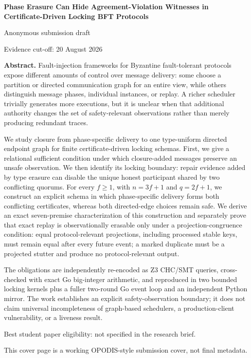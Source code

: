\documentclass[10pt,a4paper]{article}
\begin{document}
\begin{titlepage}
\centering
\vspace*{22mm}
{\LARGE\bfseries Phase Erasure Can Hide Agreement-Violation Witnesses in
Certificate-Driven Locking BFT Protocols\par}
\vspace{14mm}
{\large Anonymous submission draft\par}
\vspace{8mm}
{\small Evidence cut-off: 20 August 2026\par}
\vfill
\begin{minipage}{0.88\textwidth}
\textbf{Abstract.}
Fault-injection frameworks for Byzantine fault-tolerant protocols expose
different amounts of control over message delivery: some choose a
partition or directed communication graph for an entire view, while
others distinguish message phases, individual instances, or replay. A
richer scheduler trivially generates more executions, but it is unclear
when that additional authority changes the set of safety-relevant
observations rather than merely producing redundant traces.

We study closure from phase-specific delivery to one type-uniform
directed endpoint graph for finite certificate-driven locking schemas.
First, we give a relational sufficient condition under which
closure-added messages preserve an unsafe observation. We then identify
its locking boundary: repair evidence added by type erasure can disable
the unique honest participant shared by two conflicting quorums. For
every \(f\geq1\), with \(n=3f+1\) and \(q=2f+1\), we construct an
explicit schema in which phase-specific delivery forms both conflicting
certificates, whereas both directed-edge choices remain safe. We derive
an exact seven-premise characterization of this construction and
separately prove that exact replay is observationally erasable only
under a projection-congruence condition: equal protocol-relevant
projections, including processed stable keys, must remain equal after
every future event; a marked duplicate must be a projected stutter and
produce no protocol-relevant output.

The obligations are independently re-encoded as Z3 CHC/SMT queries,
cross-checked with exact Go big-integer arithmetic, and reproduced in
two bounded locking kernels plus a fuller two-round Go event loop and an
independent Python mirror. The work establishes an explicit
safety-observation boundary; it does not claim universal incompleteness
of graph-based schedulers, a production-client vulnerability, or a
liveness result.
\end{minipage}
\vfill
{\small Best student paper eligibility: not specified in the research brief.\par}
{\small This cover page is a working OPODIS-style submission cover, not final metadata.\par}
\end{titlepage}
\end{document}
